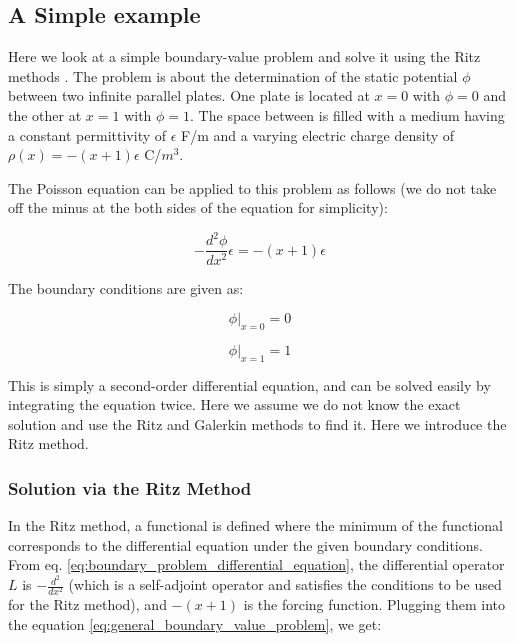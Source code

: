 \documentclass[a4paper,12pt]{report}
\begin{document}
\subsection{A Simple example}

Here we look at a simple boundary-value problem and solve it using
the Ritz methods \cite{10.5555/2655347}.
The problem is about the determination of the static potential $\phi$
between two infinite parallel plates.
One plate is located at $x=0$ with $\phi=0$ and
the other at $x=1$ with $\phi=1$.
The space between is filled with a medium having a constant permittivity
of $\epsilon$ F/m and a varying electric charge density of
$\rho(x)=-(x+1)\epsilon$ C/$m^3$.

The Poisson equation can be applied to this problem as follows
(we do not take off the minus at the both sides of the equation
for simplicity):

\begin{equation} \label{eq:simple_boundary_value_problem}
  -\frac{d^2\phi}{dx^2}\epsilon = -(x + 1)\epsilon
\end{equation}

The boundary conditions are given as:

\begin{equation}
  \left.\phi\right|_{x=0} = 0
\end{equation}

\begin{equation}
  \left.\phi\right|_{x=1}=1
\end{equation}

This is simply a second-order differential equation,
and can be solved easily by integrating the equation twice.
Here we assume we do not know the exact solution
and use the Ritz and Galerkin methods to find it.
Here we introduce the Ritz method.

\subsubsection{Solution via the Ritz Method}

In the Ritz method,
a functional is defined where the minimum of the functional
corresponds to the differential equation under the given boundary conditions.
From eq. \ref{eq:boundary_problem_differential_equation},
the differential operator $L$ is $-\frac{d^2}{dx^2}$ (which is
a self-adjoint operator and satisfies the conditions to be used for the Ritz method),
and $-(x+1)$ is the forcing function.
Plugging them into the equation \ref{eq:general_boundary_value_problem},
we get:
\end{document}
